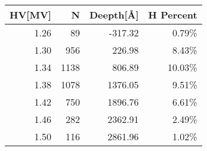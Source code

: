 \begin{tabular}{rrrr}
\toprule
  HV[MV] &    N &      Deepth[\AA] &  H Percent \\
\midrule
1.26 &   89 & -317.32 &   0.79\% \\
1.30 &  956 &  226.98 &   8.43\%\\
1.34 & 1138 &  806.89 &  10.03\% \\
1.38 & 1078 & 1376.05 &   9.51\% \\
1.42 &  750 & 1896.76 &   6.61\% \\
1.46 &  282 & 2362.91 &   2.49\% \\
1.50 &  116 & 2861.96 &   1.02\% \\
\bottomrule
\end{tabular}
